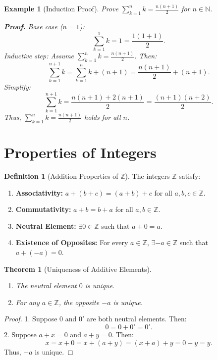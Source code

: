 \documentclass[9pt]{article}
\theoremstyle{definition}
\newtheorem{definition}{Definition}
\theoremstyle{plain}
\newtheorem{theorem}{Theorem}
\newtheorem{example}{Example}
\begin{document}
\begin{example}[Induction Proof]
Prove \( \sum_{k=1}^n k = \frac{n(n+1)}{2} \) for \( n \in \mathbb{N} \).

\textbf{Proof.} Base case (\( n=1 \)):
\[
\sum_{k=1}^1 k = 1 = \frac{1(1+1)}{2}.
\]
Inductive step: Assume \( \sum_{k=1}^n k = \frac{n(n+1)}{2} \). Then:
\[
\sum_{k=1}^{n+1} k = \sum_{k=1}^n k + (n+1) = \frac{n(n+1)}{2} + (n+1).
\]
Simplify:
\[
\sum_{k=1}^{n+1} k = \frac{n(n+1) + 2(n+1)}{2} = \frac{(n+1)(n+2)}{2}.
\]
Thus, \( \sum_{k=1}^n k = \frac{n(n+1)}{2} \) holds for all \( n \).
\end{example}

\section*{Properties of Integers}
\begin{definition}[Addition Properties of \( \mathbb{Z} \)]
The integers \( \mathbb{Z} \) satisfy:
\begin{enumerate}[label=(A\arabic*)]
    \item \textbf{Associativity:} \( a + (b + c) = (a + b) + c \) for all \( a, b, c \in \mathbb{Z} \).
    \item \textbf{Commutativity:} \( a + b = b + a \) for all \( a, b \in \mathbb{Z} \).
    \item \textbf{Neutral Element:} \( \exists 0 \in \mathbb{Z} \) such that \( a + 0 = a \).
    \item \textbf{Existence of Opposites:} For every \( a \in \mathbb{Z} \), \( \exists -a \in \mathbb{Z} \) such that \( a + (-a) = 0 \).
\end{enumerate}
\end{definition}

\begin{theorem}[Uniqueness of Additive Elements]
\begin{enumerate}
    \item The neutral element \( 0 \) is unique.
    \item For any \( a \in \mathbb{Z} \), the opposite \( -a \) is unique.
\end{enumerate}
\end{theorem}

\begin{proof}
1. Suppose \( 0 \) and \( 0' \) are both neutral elements. Then:
\[
0 = 0 + 0' = 0'.
\]
2. Suppose \( a + x = 0 \) and \( a + y = 0 \). Then:
\[
x = x + 0 = x + (a + y) = (x + a) + y = 0 + y = y.
\]
Thus, \( -a \) is unique.
\end{proof}
\end{document}
